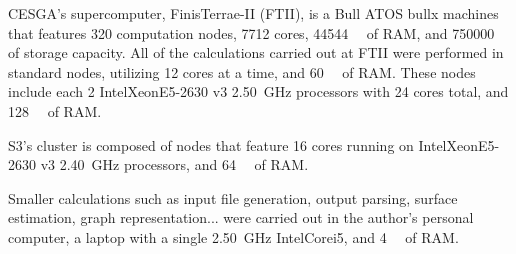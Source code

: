 CESGA's supercomputer, FinisTerrae-II (FTII), is a Bull ATOS bullx machines that features \num{320} computation nodes, \num{7712} cores, \SI{44544}{\giga\byte} of RAM, and \SI{750000}{\giga\byte} of storage capacity.
All of the calculations carried out at FTII were performed in standard nodes, utilizing \num{12} cores at a time, and \SI{60}{\giga\byte} of RAM.
These nodes include each 2 Intel\textregistered Xeon\textregistered E5-2630 v3 \SI{2.50}{\giga\hertz} processors with \num{24} cores total, and \SI{128}{\giga\byte} of RAM.

S3's cluster is composed of nodes that feature \num{16} cores running on Intel\textregistered Xeon\textregistered E5-2630 v3 \SI{2.40}{\giga\hertz} processors, and \SI{64}{\giga\byte} of RAM.

Smaller calculations such as input file generation, output parsing, surface estimation, graph representation... were carried out in the author's personal computer, a laptop with a single \SI{2.50}{\giga\hertz} Intel\textregistered Core\textregistered i5, and \SI{4}{\giga\byte} of RAM.

